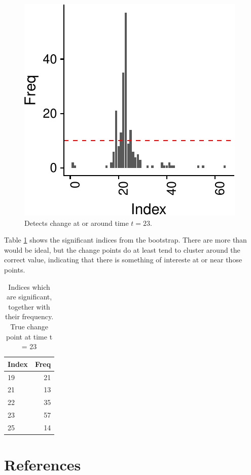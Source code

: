 \documentclass[smallextended]{svjour3}       %
\begin{document}
\begin{example}
\begin{figure}[H]\includegraphics{springer_template_files/figure-latex/chunk_11-1} 
\caption{Detects change at or around time $t = 23$.}
\label{fig:11}\end{figure}

Table \ref{tab:chunk_12} shows the significant indices from the bootstrap. There are more than would be ideal, but the change points do at least tend to cluster around the correct value, indicating that there is something of intereste at or near those points.

\begin{longtable}[t]{lr}
\caption{\label{tab:chunk_12}Indices which are significant, together with their frequency. True change point at time t = 23}\\
\toprule
Index & Freq\\
\midrule
19 & 21\\
21 & 13\\
22 & 35\\
23 & 57\\
25 & 14\\
\bottomrule
\end{longtable}
\end{example}

\section{References}\label{references}



\end{document}
